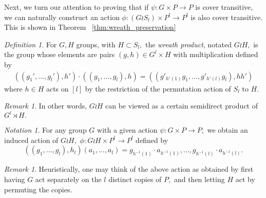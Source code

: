 \documentclass{amsart}
\theoremstyle{remark}
\newtheorem{rem}[thm]{Remark}
\newtheorem{defn}[thm]{Definition}
\newtheorem{note}[thm]{Notation}
\begin{document}
Next, we turn our attention to proving that if $\psi:G \times P \rightarrow P$ is cover transitive, we can naturally construct an action $\phi:(G\wr S_l)\times P^l \rightarrow P^l$ is also cover transitive. This is shown in Theorem ~\ref{thm:wreath_preservation}

\begin{defn}
For $G, H$ groups, with $H \subset S_l,$ the {\it wreath product}, notated $G \wr H,$ is the group whose elements are pairs $(g,h) \in G^l\times H$ with multiplication defined by
\begin{align*}
((g_1',\ldots, g_l'),h') \cdot ((g_1,\ldots, g_l) ,h) =((g'_{h'(1)}g_1,\ldots, g'_{h'(l)}g_l),hh')
\end{align*}
where $h \in H$ acts on $[l]$ by the restriction of the permutation action of $S_l$ to $H.$
\end{defn}
\begin{rem}
In other words, $G\wr H$ can be viewed as a certain semidirect product of $G^l \rtimes H.$ 
\end{rem}

\begin{note}
\label{note:wreath_action}
For any group $G$ with a given action $\psi:G\times P \rightarrow P,$ we obtain an induced action of $G \wr H,$ $\phi:G \wr H \times P^l \rightarrow P^l$ defined by 
$$((g_1,\ldots, g_l),h_l)(a_1,\ldots, a_l) = g_{h^{-1}(1)}\cdot a_{h^{-1}(1)},\ldots,g_{h^{-1}(l)} \cdot a_{h^{-1}(l)}.$$
\end{note}

\begin{rem}
Heuristically, one may think of the above action as obtained by first having $G$ act separately on the $l$ distinct copies of $P,$ and then letting $H$ act by permuting the copies.
\end{rem}
\end{document}
